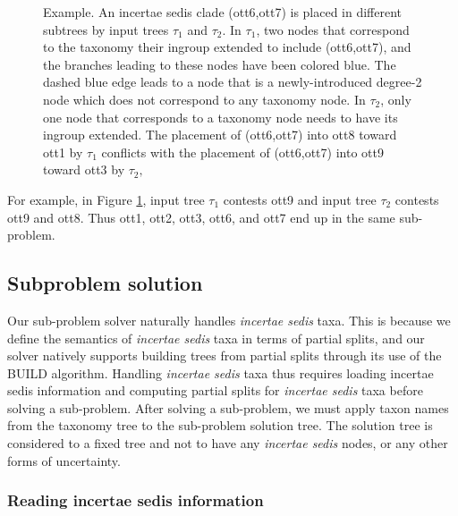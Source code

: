 \documentclass[english]{article}
\newcommand{\lyxdot}{.}
\begin{document}
\begin{figure}

\caption{\label{fig:placement-example1}Example.
An incertae sedis clade (ott6,ott7)
is placed in different subtrees by input trees $\tau_{1}$ and $\tau_{2}$.
In $\tau_{1}$, two nodes that correspond to the taxonomy their ingroup
extended to include (ott6,ott7), and the branches leading to these
nodes have been colored blue.
The dashed blue edge leads to a node
that is a newly-introduced degree-2 node which does not correspond
to any taxonomy node.
In $\tau_{2}$, only one node that corresponds
to a taxonomy node needs to have its ingroup extended.
The placement
of (ott6,ott7) into ott8 toward ott1 by $\tau_{1}$ conflicts with
the placement of (ott6,ott7) into ott9 toward ott3 by $\tau_{2},$}
\end{figure}
 For example, in Figure
\ref{fig:placement-example1}, input tree $\tau_{1}$ contests ott9 and
input tree $\tau_{2}$ contests ott9 and ott8.
Thus ott1, ott2, ott3,
ott6, and ott7 end up in the same sub-problem.

\subsection{Subproblem solution}

Our sub-problem solver naturally handles \emph{incertae sedis} taxa.
This is because we define the semantics of \emph{incertae sedis} taxa
in terms of partial splits, and our solver natively supports building
trees from partial splits through its use of the BUILD algorithm.
Handling \emph{incertae sedis} taxa thus requires loading incertae
sedis information and computing partial splits for \emph{incertae
sedis} taxa before solving a sub-problem.
After solving a sub-problem,
we must apply taxon names from the taxonomy tree to the sub-problem
solution tree.
The solution tree is considered to a fixed tree and not
to have any \emph{incertae sedis} nodes, or any other forms of
uncertainty.

\subsubsection{Reading incertae sedis information}
\end{document}
